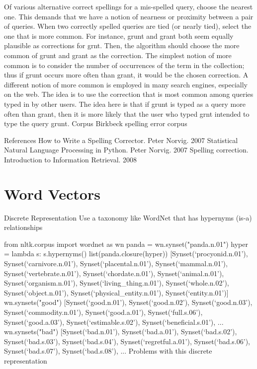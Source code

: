 Of various alternative correct spellings for a mis-spelled query, choose the nearest one. This demands that we have a notion of nearness or proximity between a pair of queries.
When two correctly spelled queries are tied (or nearly tied), select the one that is more common. For instance, grunt and grant both seem equally plausible as corrections for grnt. Then, the algorithm should choose the more common of grunt and grant as the correction. The simplest notion of more common is to consider the number of occurrences of the term in the collection; thus if grunt occurs more often than grant, it would be the chosen correction. A different notion of more common is employed in many search engines, especially on the web. The idea is to use the correction that is most common among queries typed in by other users. The idea here is that if grunt is typed as a query more often than grant, then it is more likely that the user who typed grnt intended to type the query grunt.
Corpus
Birkbeck spelling error corpus

References
How to Write a Spelling Corrector. Peter Norvig. 2007
Statistical Natural Language Processing in Python. Peter Norvig. 2007
Spelling correction. Introduction to Information Retrieval. 2008

\section{Word Vectors}

Discrete Representation
Use a taxonomy like WordNet that has hypernyms (is-a) relationships

from nltk.corpus import wordnet as wn
panda = wn.synset("panda.n.01")
hyper = lambda s: s.hypernyms()
list(panda.closure(hyper))
[Synset(‘procyonid.n.01’),
Synset(‘carnivore.n.01’),
Synset(‘placental.n.01’),
Synset(‘mammal.n.01’),
Synset(‘vertebrate.n.01’),
Synset(‘chordate.n.01’),
Synset(‘animal.n.01’),
Synset(‘organism.n.01’),
Synset(‘living_thing.n.01’),
Synset(‘whole.n.02’),
Synset(‘object.n.01’),
Synset(‘physical_entity.n.01’),
Synset(‘entity.n.01’)]
wn.synsets("good")
[Synset(‘good.n.01’),
Synset(‘good.n.02’),
Synset(‘good.n.03’),
Synset(‘commodity.n.01’),
Synset(‘good.a.01’),
Synset(‘full.s.06’),
Synset(‘good.a.03’),
Synset(‘estimable.s.02’),
Synset(‘beneficial.s.01’),
...
wn.synsets("bad")
[Synset(‘bad.n.01’),
Synset(‘bad.a.01’),
Synset(‘bad.s.02’),
Synset(‘bad.s.03’),
Synset(‘bad.s.04’),
Synset(‘regretful.a.01’),
Synset(‘bad.s.06’),
Synset(‘bad.s.07’),
Synset(‘bad.s.08’),
...
Problems with this discrete representation


